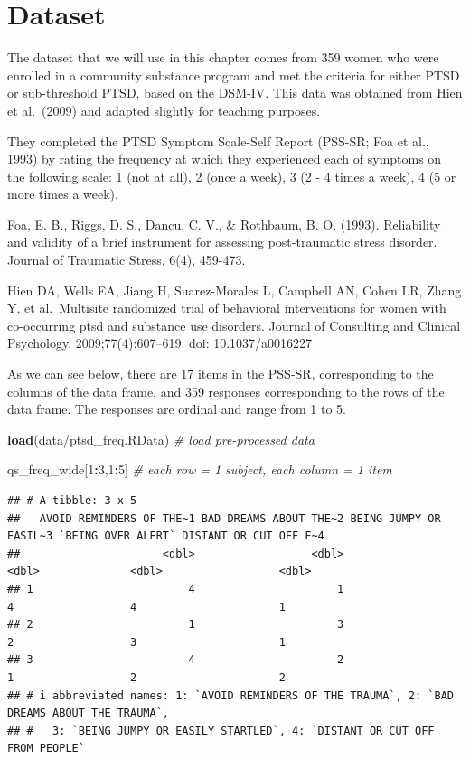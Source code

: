 \documentclass[
]{book}
\newenvironment{Shaded}{\begin{snugshade}}{\end{snugshade}}
\newcommand{\CommentTok}[1]{\textcolor[rgb]{0.56,0.35,0.01}{\textit{#1}}}
\newcommand{\DecValTok}[1]{\textcolor[rgb]{0.00,0.00,0.81}{#1}}
\newcommand{\FunctionTok}[1]{\textcolor[rgb]{0.13,0.29,0.53}{\textbf{#1}}}
\newcommand{\NormalTok}[1]{#1}
\newcommand{\SpecialCharTok}[1]{\textcolor[rgb]{0.81,0.36,0.00}{\textbf{#1}}}
\newcommand{\StringTok}[1]{\textcolor[rgb]{0.31,0.60,0.02}{#1}}
\begin{document}
\section{Dataset}\label{dataset}

The dataset that we will use in this chapter comes from 359 women who were enrolled in a community substance program and met the criteria for either PTSD or sub-threshold PTSD, based on the DSM-IV. This data was obtained from Hien et al.~(2009) and adapted slightly for teaching purposes.

They completed the PTSD Symptom Scale-Self Report (PSS-SR; Foa et al., 1993) by rating the frequency at which they experienced each of symptoms on the following scale: 1 (not at all), 2 (once a week), 3 (2 - 4 times a week), 4 (5 or more times a week).

Foa, E. B., Riggs, D. S., Dancu, C. V., \& Rothbaum, B. O. (1993). Reliability and validity of a brief instrument for assessing post‐traumatic stress disorder. Journal of Traumatic Stress, 6(4), 459-473.

Hien DA, Wells EA, Jiang H, Suarez-Morales L, Campbell AN, Cohen LR, Zhang Y, et al.~Multisite randomized trial of behavioral interventions for women with co-occurring ptsd and substance use disorders. Journal of Consulting and Clinical Psychology. 2009;77(4):607--619. doi: 10.1037/a0016227

As we can see below, there are 17 items in the PSS-SR, corresponding to the columns of the data frame, and 359 responses corresponding to the rows of the data frame. The responses are ordinal and range from 1 to 5.

\begin{Shaded}
\begin{Highlighting}[]
\FunctionTok{load}\NormalTok{(}\StringTok{\textquotesingle{}data/ptsd\_freq.RData\textquotesingle{}}\NormalTok{) }\CommentTok{\# load pre{-}processed data }

\NormalTok{qs\_freq\_wide[}\DecValTok{1}\SpecialCharTok{:}\DecValTok{3}\NormalTok{,}\DecValTok{1}\SpecialCharTok{:}\DecValTok{5}\NormalTok{] }\CommentTok{\# each row = 1 subject, each column = 1 item }
\end{Highlighting}
\end{Shaded}

\begin{verbatim}
## # A tibble: 3 x 5
##   AVOID REMINDERS OF THE~1 BAD DREAMS ABOUT THE~2 BEING JUMPY OR EASIL~3 `BEING OVER ALERT` DISTANT OR CUT OFF F~4
##                      <dbl>                  <dbl>                  <dbl>              <dbl>                  <dbl>
## 1                        4                      1                      4                  4                      1
## 2                        1                      3                      2                  3                      1
## 3                        4                      2                      1                  2                      2
## # i abbreviated names: 1: `AVOID REMINDERS OF THE TRAUMA`, 2: `BAD DREAMS ABOUT THE TRAUMA`,
## #   3: `BEING JUMPY OR EASILY STARTLED`, 4: `DISTANT OR CUT OFF FROM PEOPLE`
\end{verbatim}
\end{document}
